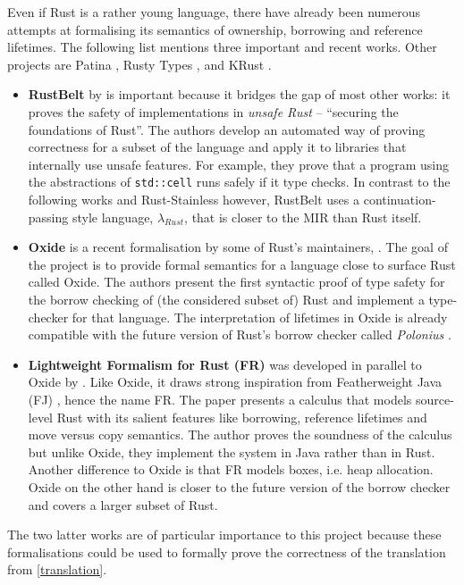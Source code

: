 Even if Rust is a rather young language, there have already been numerous
attempts at formalising its semantics of ownership, borrowing and reference
lifetimes. The following list mentions three important and recent works. Other
projects are Patina \cite{patina}, Rusty Types \cite{rusty-types}, and KRust
\cite{krust}.

\begin{itemize}
\item \textbf{RustBelt} by \citet{rustbelt} is important because it bridges the
gap of most other works: it proves the safety of implementations in \emph{unsafe
Rust} -- ``securing the foundations of Rust''. The authors develop an automated
way of proving correctness for a subset of the language and apply it to
libraries that internally use unsafe features. For example, they prove that a
program using the abstractions of \passthrough{\lstinline!std::cell!} runs
safely if it type checks. In contrast to the following works and Rust-Stainless
however, RustBelt uses a continuation-passing style language,
\(\lambda_{Rust}\), that is closer to the MIR than Rust itself.

\item \textbf{Oxide} is a recent formalisation by some of Rust's maintainers,
\citet{oxide}. The goal of the project is to provide formal semantics for a
language close to surface Rust called Oxide. The authors present the first
syntactic proof of type safety for the borrow checking of (the considered subset
of) Rust and implement a type-checker for that language. The interpretation of
lifetimes in Oxide is already compatible with the future version of Rust's
borrow checker called \emph{Polonius} \cite{polonius}.

\item \textbf{Lightweight Formalism for Rust (FR)} was developed in parallel to
Oxide by \citet{fr}. Like Oxide, it draws strong inspiration from Featherweight
Java (FJ) \cite{fj}, hence the name FR. The paper presents a calculus that
models source-level Rust with its salient features like borrowing, reference
lifetimes and move versus copy semantics. The author proves the soundness of the
calculus but unlike Oxide, they implement the system in Java rather than in
Rust. Another difference to Oxide is that FR models boxes, i.e. heap allocation.
Oxide on the other hand is closer to the future version of the borrow checker
and covers a larger subset of Rust.
\end{itemize}

The two latter works are of particular importance to this project because these
formalisations could be used to formally prove the correctness of the
translation from \autoref{translation}.

